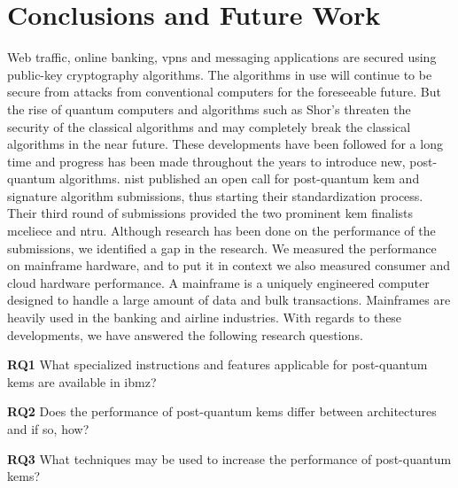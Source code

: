 \chapter{Conclusions and Future Work}
\label{chapter:conclusion}

\noindent Web traffic, online banking, \glspl{vpn} and messaging applications are secured using public-key cryptography algorithms. The algorithms in use will continue to be secure from attacks from conventional computers for the foreseeable future.  But the rise of quantum computers and algorithms such as Shor's threaten the security of the classical algorithms and may completely break the classical algorithms in the near future. These developments have been followed for a long time and progress has been made throughout the years to introduce new, post-quantum algorithms. \acrfull{nist} published an open call for post-quantum \gls{kem} and signature algorithm submissions, thus starting their standardization process. Their third round of submissions provided the two prominent \gls{kem} finalists \gls{mceliece} and \gls{ntru}. Although research has been done on the performance of the submissions, we identified a gap in the research. We measured the performance on mainframe hardware, and to put it in context we also measured consumer and cloud hardware performance. A mainframe is a uniquely engineered computer designed to handle a large amount of data and bulk transactions. Mainframes are heavily used in the banking and airline industries. With regards to these developments, we have answered the following research questions.

\begin{description}
    \item \textbf{RQ1} What specialized instructions and features applicable for \gls{post-quantum} \acrlong{kem}s are available in \gls{ibmz}?
    
    \item \textbf{RQ2} Does the performance of \gls{post-quantum} \acrlong{kem}s differ between architectures and if so, how?
    
    \item \textbf{RQ3} What techniques may be used to increase the performance of \gls{post-quantum} \acrlong{kem}s?
\end{description}

